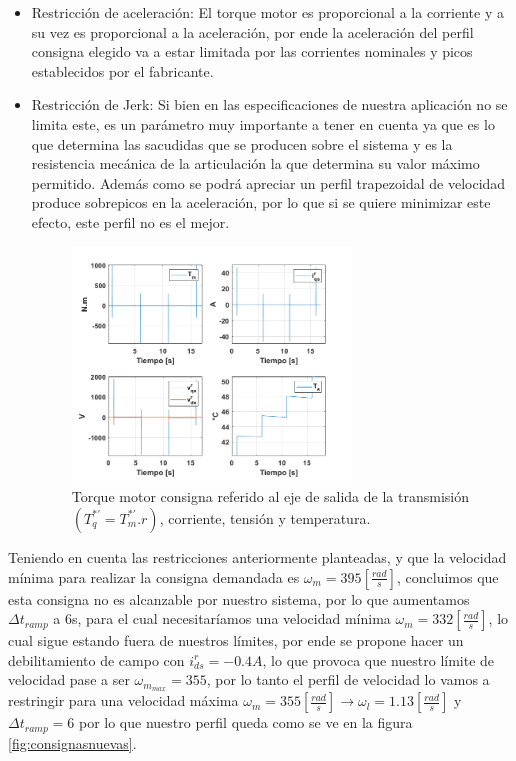 \documentclass[10pt]{article}
\begin{document}
\begin{itemize}
\begin{itemize}
	 \item Restricción de aceleración: El torque motor es proporcional a la corriente y a su vez es proporcional a la aceleración, por ende la aceleración del perfil consigna elegido
	 va a estar limitada por las corrientes nominales y picos establecidos por el fabricante.

	 \item Restricción de Jerk: Si bien en las especificaciones de nuestra aplicación no se limita este, es un parámetro muy importante a tener en cuenta ya que es lo que determina las sacudidas 
	 que se producen sobre el sistema y es la resistencia mecánica de la articulación la que determina su valor máximo permitido. Además como se podrá apreciar un perfil trapezoidal de velocidad
	 produce sobrepicos en la aceleración, por lo que si se quiere minimizar este efecto, este perfil no es el mejor.
\begin{figure}[h!]
	\centering
	\includegraphics[width=0.7\textwidth]{parametros.png}
	\caption{\label{fig:parametros}Torque motor consigna referido al eje de salida de la transmisión $(T^{*'}_{q}=T^{*'}_{m}.r)$, corriente, tensión y temperatura.}
	\end{figure}
 \end{itemize}

 Teniendo en cuenta las restricciones anteriormente planteadas, y que la velocidad mínima para realizar la consigna demandada es $\omega_{m}=395[\frac{rad}{s}]$, concluimos que esta consigna no es alcanzable
 por nuestro sistema, por lo que aumentamos $\Delta t_{ramp}$ a 6s, para el cual necesitaríamos una velocidad mínima $\omega_{m}=332[\frac{rad}{s}]$, lo cual sigue estando fuera de nuestros límites, por ende se propone hacer un debilitamiento
 de campo con $i^{r}_{ds}=-0.4A$, lo que provoca que nuestro límite de velocidad pase a ser $\omega_{m_{max}}=355$, por lo tanto el perfil de velocidad lo vamos a restringir para una velocidad máxima $\omega_{m}=355[\frac{rad}{s}]\rightarrow \omega_{l}=1.13[\frac{rad}{s}]$ y 
 $\Delta t_{ramp}=6$ por lo que nuestro perfil queda como se ve en la figura \ref{fig:consignasnuevas}.
 

\end{itemize}
\end{document}
